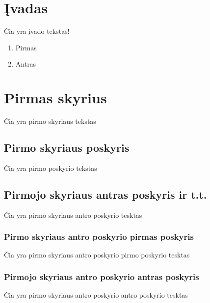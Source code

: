 \documentclass[a4paper, 12pt]{article} %
\begin{document}
\begin{onehalfspacing}

\section*{\k{I}vadas} %


\v{C}ia yra \k{i}vado tekstas!

\begin{enumerate}[itemsep=12pt, parsep=-12pt] %
\item Pirmas
\item Antras
\end{enumerate}
\newpage

\section{Pirmas skyrius}

\v{C}ia yra pirmo skyriaus tekstas

    \subsection{Pirmo skyriaus poskyris}

 \v{C}ia yra pirmo poskyrio tekstas

    \subsection{Pirmojo skyriaus antras poskyris ir t.t.}

     \v{C}ia yra pirmo skyriaus antro poskyrio tesktas
  
        \subsubsection{Pirmo skyriaus antro poskyrio pirmas poskyris}

           \v{C}ia yra pirmo skyriaus antro poskyrio pirmo poskyrio tesktas
   
        \subsubsection{Pirmojo skyriaus antro poskyrio antras poskyris}

             \v{C}ia yra pirmo skyriaus antro poskyrio antro poskyrio tesktas


\end{onehalfspacing}
\end{document}
